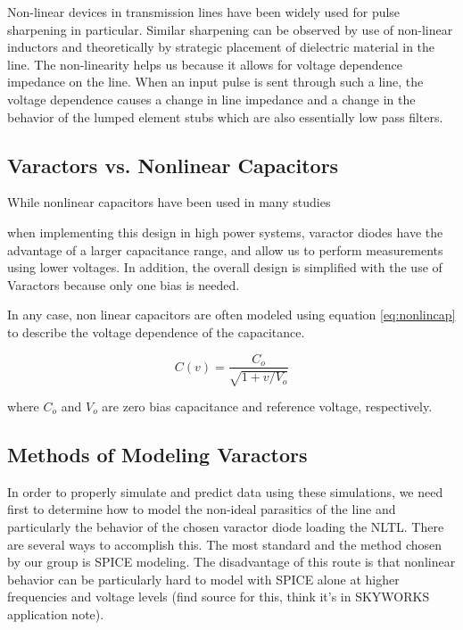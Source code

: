\documentclass[journal]{IEEEtran} \usepackage[english]{babel}
\begin{document}
Non-linear devices in transmission lines have been widely used for pulse
sharpening in particular. Similar sharpening can be observed by use of
non-linear inductors and theoretically by strategic placement of dielectric
material in the line\cite{wilson1991pulse}. The non-linearity helps us because
it allows for voltage dependence impedance on the line. When an input pulse is
sent through such a line, the voltage dependence causes a change in line
impedance and a change in the behavior of the lumped element stubs which are
also essentially low pass filters.


\subsection{Varactors vs. Nonlinear Capacitors}

While nonlinear capacitors have been used in many studies

\cite{FastHighVoltageNLTL} when implementing this design in high power systems,
varactor diodes have the advantage of a larger capacitance range, and allow us
to perform measurements using lower voltages. In addition, the overall design is
simplified with the use of Varactors because only one bias is needed.

In any case, non linear capacitors are often modeled using equation
\ref{eq:nonlincap} to describe the voltage dependence of the
capacitance\cite{nikoo2018theory}.


\begin{equation}\label{eq:nonlincap}
C(v) = \frac{C_{o}}{\sqrt{1+v/V_{o}}}
\end{equation}

where $C_{o}$ and $V_{o}$ are zero bias capacitance and reference voltage,
respectively.



\subsection{Methods of Modeling Varactors}
    In order to properly simulate and predict data using these simulations, we
    need first to determine how to model the non-ideal parasitics of the line
    and particularly the behavior of the chosen varactor diode loading the NLTL.
    There are several ways to accomplish this. The most standard and the method
    chosen by our group is SPICE modeling. The disadvantage of this route is
    that nonlinear behavior can be particularly hard to model with SPICE alone
    at higher frequencies and voltage levels (find source for this, think it's
    in SKYWORKS application note).
    
\end{document}
